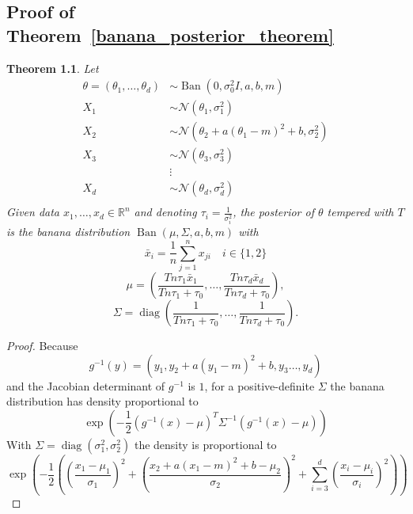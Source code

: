 \documentclass[english,twoside,openright]{HYgraduMLDS}
\newtheorem{theorem}{Theorem}
\newcommand{\R}{\mathbb{R}}
\newcommand{\caln}{{\mathcal{N}}}
\DeclareMathOperator{\ban}{Ban}
\DeclareMathOperator{\diag}{diag}
\begin{document}
\begin{appendices}
\myappendixtitle

\chapter{Proof of Theorem~\ref{banana_posterior_theorem}}\label{banana_posterior_theorem_proof}

\setcounter{temp_counter}{\value{theorem}}
\setcounter{theorem}{\value{banana_posterior_theorem_number}}
\addtocounter{theorem}{-1}
\begin{theorem}
    Let
    \begin{align*}
        \theta = (\theta_1,\dotsc, \theta_d) &\sim
        \ban(0, \sigma_0^2I, a, b, m) \\
        X_1 &\sim \caln(\theta_1, \sigma_1^2) \\
        X_2 &\sim \caln(\theta_2 + a(\theta_1 - m)^2 + b, \sigma_2^2)\\
        X_3 &\sim \caln(\theta_3, \sigma_3^2) \\
            &\vdots \\
        X_d &\sim \caln(\theta_d, \sigma_d^2) \\
    \end{align*}
    Given data \(x_1,\dotsc, x_d\in \R^n\) and
    denoting \(\tau_i = \frac{1}{\sigma_i^2}\),
    the posterior of \(\theta\) tempered with \(T\) is the banana distribution
    \(\ban(\mu, \Sigma, a, b, m)\)
    with
    \[
        \bar{x}_i = \frac{1}{n}\sum_{j=1}^n x_{ji} \quad i\in \{1, 2\}
    \]
    \[
        \mu = \left(\frac{Tn\tau_1\bar{x}_1}{Tn\tau_1 + \tau_0},\dotsc,
        \frac{Tn\tau_d\bar{x}_d}{Tn\tau_d + \tau_0}\right),
    \]
    \[
        \Sigma = \diag\left(
            \frac{1}{Tn\tau_1 + \tau_0},\dotsc,
            \frac{1}{Tn\tau_d + \tau_0}
        \right).
    \]
\end{theorem}
\begin{proof}
    Because
    \[
    g^{-1}(y) = (y_1, y_2 + a(y_1 - m)^2 + b, y_3\dotsc, y_d)
    \]
    and the Jacobian determinant of \(g^{-1}\) is \(1\),
    for a positive-definite \(\Sigma\) the banana distribution has
    density proportional to
    \[
    \exp\left(-\frac{1}{2}(g^{-1}(x) - \mu)^T\Sigma^{-1}(g^{-1}(x) - \mu)\right)
    \]
    With \(\Sigma = \diag(\sigma_1^2, \sigma_2^2)\) the density is proportional
    to
    \[
    \exp
    \left(-\frac{1}{2}\left(\left(\frac{x_1 - \mu_1}{\sigma_1}\right)^2
    + \left(\frac{x_2 + a(x_1 - m)^2 + b - \mu_2}{\sigma_2}\right)^2
    + \sum_{i=3}^d\left(\frac{x_i - \mu_i}{\sigma_i}\right)^2\right)\right)
    \]


\end{proof}
\end{appendices}
\end{document}
